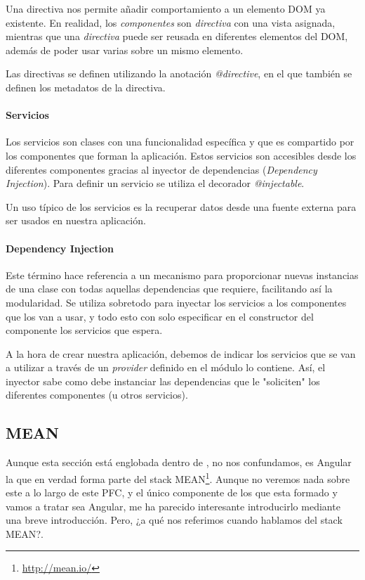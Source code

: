 Una directiva nos permite añadir comportamiento a un elemento \gls{DOM} ya existente. En realidad, los \emph{componentes} son \emph{directiva} con una vista asignada, mientras que una \emph{directiva} puede ser reusada en diferentes elementos del \gls{DOM}, además de poder usar varias sobre un mismo elemento.

Las directivas se definen utilizando la anotación \emph{@directive}, en el que también se definen los metadatos de la directiva.

\paragraph{Servicios}

Los servicios son clases con una funcionalidad específica y que es compartido por los componentes que forman la aplicación. Estos servicios son accesibles desde los diferentes componentes gracias al inyector de dependencias (\emph{Dependency Injection}). Para definir un servicio se utiliza el decorador \emph{@injectable}.

Un uso típico de los servicios es la recuperar datos desde una fuente externa para ser usados en nuestra aplicación.

\paragraph{Dependency Injection}

Este término hace referencia a un mecanismo para proporcionar nuevas instancias de una clase con todas aquellas dependencias que requiere, facilitando así la modularidad. Se utiliza sobretodo para inyectar los servicios a los componentes que los van a usar, y todo esto con solo especificar en el constructor del componente los servicios que espera.

A la hora de crear nuestra aplicación, debemos de indicar los servicios que se van a utilizar a través de un \emph{provider} definido en el módulo lo contiene. Así, el inyector sabe como debe instanciar las dependencias que le "soliciten" los diferentes componentes (u otros servicios).

\subsection{MEAN}\label{subsec:MEAN}

\cite{MEAN} Aunque esta sección está englobada dentro de , no nos confundamos, es Angular la que en verdad forma parte del stack \gls{MEAN}\footnote{\url{http://mean.io/}}. Aunque no veremos nada sobre este a lo largo de este \gls{PFC}, y el único componente de los que esta formado y vamos a tratar sea Angular, me ha parecido interesante introducirlo mediante una breve introducción. Pero, ¿a qué nos referimos cuando hablamos del stack \gls{MEAN}?.


